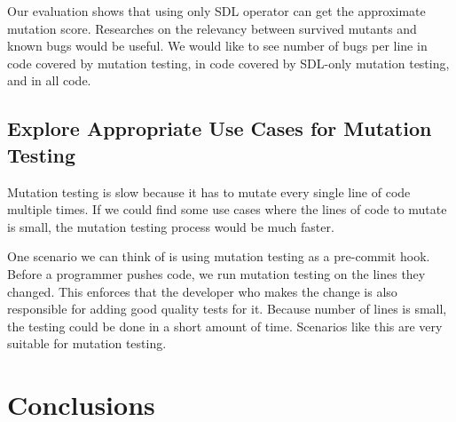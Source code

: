 \documentclass[12pt]{article}
\begin{document}
Our evaluation shows that using only SDL operator can get the approximate mutation score. Researches on the relevancy between survived mutants and known bugs would be useful. We would like to see number of bugs per line in code covered by mutation testing, in code covered by SDL-only mutation testing, and in all code.

\subsection{Explore Appropriate Use Cases for Mutation Testing}

Mutation testing is slow because it has to mutate every single line of code multiple times. If we could find some use cases where the lines of code to mutate is small, the mutation testing process would be much faster.

One scenario we can think of is using mutation testing as a pre-commit hook. Before a programmer pushes code, we run mutation testing on the lines they changed. This enforces that the developer who makes the change is also responsible for adding good quality tests for it. Because number of lines is small, the testing could be done in a short amount of time. Scenarios like this are very suitable for mutation testing.

\section{Conclusions}



\end{document}
